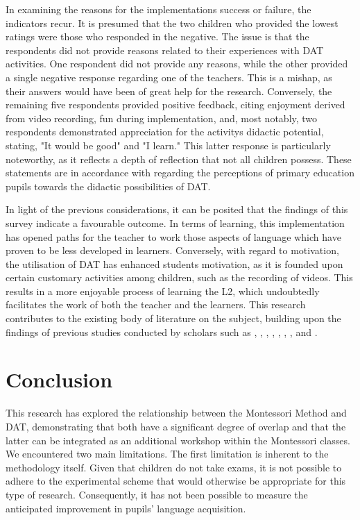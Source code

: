 In examining the reasons for the implementation\textquotesingle s
success or failure, the indicators recur. It is presumed that the two
children who provided the lowest ratings were those who responded in the
negative. The issue is that the respondents did not provide reasons
related to their experiences with DAT activities. One respondent did not
provide any reasons, while the other provided a single negative response
regarding one of the teachers. This is a mishap, as their answers would
have been of great help for the research. Conversely, the remaining five
respondents provided positive feedback, citing enjoyment derived from
video recording, fun during implementation, and, most notably, two
respondents demonstrated appreciation for the activity\textquotesingle s
didactic potential, stating, "It would be good" and "I learn." This
latter response is particularly noteworthy, as it reflects a depth of
reflection that not all children possess. These statements are in
accordance with \textcite{fernandez-costeles2021} regarding the perceptions of
primary education pupils towards the didactic possibilities of DAT.

In light of the previous considerations, it can be posited that the
findings of this survey indicate a favourable outcome. In terms of
learning, this implementation has opened paths for the teacher to work
those aspects of language which have proven to be less developed in
learners. Conversely, with regard to motivation, the utilisation of DAT
has enhanced students motivation, as it is founded upon certain
customary activities among children, such as the recording of videos.
This results in a more enjoyable process of learning the L2, which
undoubtedly facilitates the work of both the teacher and the learners.
This research contributes to the existing body of literature on the
subject, building upon the findings of previous studies conducted by
scholars such as \textcite{neves2004language}, \textcite{talavan2009aplicaciones,talavan2010audiovisual}, \textcite{banos2015clipflair}, \textcite{talavan2015first}, \Textcite{BELTRAMELLO_2019}, \textcite{lertola2019audiovisual}, \textcite{talavan2022audiovisual}, \textcite{rodríguez-Arancón2023} and \textcite{talavan2024}.

\section{Conclusion}

This research has explored the relationship between the Montessori Method and DAT, demonstrating that both have a significant degree of overlap and that the latter can be integrated as an additional workshop within the Montessori classes. We encountered two main limitations. The first limitation is inherent to the methodology itself. Given that children do not take exams, it is not possible to adhere to the experimental scheme that would otherwise be appropriate for this type of research. Consequently, it has not been possible to measure the anticipated improvement in pupils' language acquisition.

